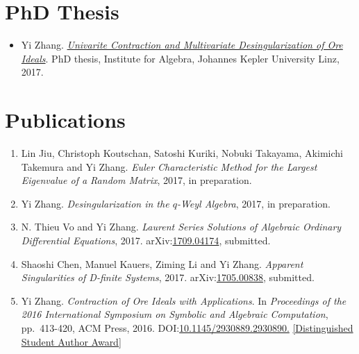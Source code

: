 \documentclass[a4paper,12pt]{article}
\begin{document}
\section*{\Large{PhD Thesis}}
\begin{itemize}
 \item Yi Zhang. \href{https://yzhang1616.github.io/yzhang_PhDthesis_final.pdf}{{\em Univarite Contraction and Multivariate Desingularization of Ore Ideals}}. 
                PhD thesis, Institute for Algebra, Johannes Kepler University Linz, 2017.
\end{itemize}


\section*{\Large{Publications}}
\begin{enumerate}
\item Lin Jiu, Christoph Koutschan, Satoshi Kuriki, Nobuki Takayama, Akimichi Takemura and Yi Zhang. 
 {\em Euler Characteristic Method for the Largest Eigenvalue of a Random Matrix}, 2017, in preparation. 
\item Yi Zhang. {\em Desingularization in the $q$-Weyl Algebra}, 2017, in preparation.
\item N. Thieu Vo and Yi Zhang. {\em Laurent Series Solutions of Algebraic Ordinary Differential Equations}, 2017. 
 arXiv:\href{https://arxiv.org/abs/1709.04174}{1709.04174}, submitted. 
\item Shaoshi Chen, Manuel Kauers, Ziming Li and Yi Zhang. {\em Apparent Singularities of D-finite Systems}, 2017. 
 arXiv:\href{http://arxiv.org/abs/1705.00838}{1705.00838}, submitted.
\item Yi Zhang. {\em Contraction of Ore Ideals with Applications}. 
In {\em Proceedings of the 2016 International Symposium on Symbolic and Algebraic Computation}, 
pp.\ 413-420, ACM Press, 2016. DOI:\href{http://dl.acm.org/citation.cfm?id=2930890}{10.1145/2930889.2930890.} 
\href{https://www.sigsam.org/Awards/ISSACAwards.html}{[Distinguished Student Author Award]}
\end{enumerate}
\end{document}
